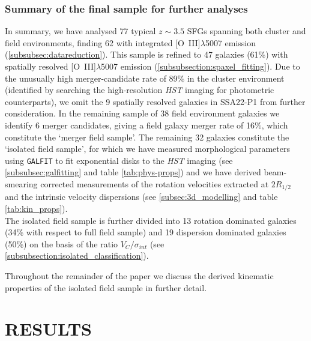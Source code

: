 \documentclass[fleqn,usenatbib]{mn2e}
\begin{document}
\subsubsection{Summary of the final sample for further analyses}\label{subsubsec:kin_sample_summary}
In summary, we have analysed 77 typical $z\sim3.5$ SFGs spanning both cluster and field environments, finding 62 with integrated [O~{\sc III}]$\lambda$5007 emission (\cref{subsubsec:datareduction}).
This sample is refined to 47 galaxies (61\%) with spatially resolved [O~{\sc III}]$\lambda$5007 emission (\cref{subsubsection:spaxel_fitting}).
Due to the unusually high merger-candidate rate of 89\% in the cluster environment (identified by searching the high-resolution {\em HST} imaging for photometric counterparts), we omit the 9 spatially resolved galaxies in SSA22-P1 from further consideration.
In the remaining sample of 38 field environment galaxies we identify 6 merger candidates, giving a field galaxy merger rate of 16\%, which constitute the `merger field sample'.
The remaining 32 galaxies constitute the `isolated field sample', for which we have measured morphological parameters using {\tt GALFIT} to fit exponential disks to the {\em HST} imaging (see \cref{subsubsec:galfitting} and table \ref{tab:phys-props}) and we have derived beam-smearing corrected measurements of the rotation velocities extracted at $2R_{1/2}$ and the intrinsic velocity dispersions (see \cref{subsec:3d_modelling} and table \ref{tab:kin_props}). \\

The isolated field sample is further divided into 13 rotation dominated galaxies (34\% with respect to full field sample) and 19 dispersion dominated galaxies (50\%) on the basis of the ratio $V_{C}/\sigma_{int}$ (see \cref{subsubsection:isolated_classification}).

Throughout the remainder of the paper we discuss the derived kinematic properties of the isolated field sample in further detail.

\section{RESULTS}\label{sec:results}
\end{document}
